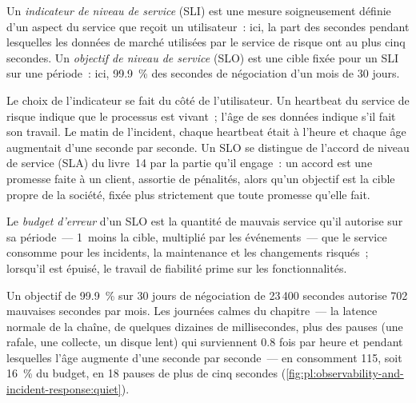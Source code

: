 \begin{definition}\label{def:pl:observability-and-incident-response:sli}
Un \emph{indicateur de niveau de service} (SLI) est une mesure soigneusement définie d'un aspect du service que reçoit un
utilisateur~: ici, la part des secondes pendant lesquelles les données de marché utilisées par le service de risque ont au plus cinq secondes. Un \emph{objectif de
niveau de service} (SLO) est une cible fixée pour un SLI sur une période~: ici, 99.9~\% des secondes de négociation d'un mois de 30 jours.
\end{definition}

Le choix de l'indicateur se fait du côté de l'utilisateur. Un heartbeat du service de risque indique que le processus est vivant~; l'âge de ses données indique
s'il fait son travail. Le matin de l'incident, chaque heartbeat était à l'heure et chaque âge augmentait d'une seconde par seconde. Un SLO se distingue
de l'accord de niveau de service (SLA) du livre~14 par la partie qu'il engage~: un accord est une promesse faite à un client, assortie de pénalités, alors qu'un objectif est la cible propre de la société,
fixée plus strictement que toute promesse qu'elle fait.

\begin{definition}\label{def:pl:observability-and-incident-response:budget}
Le \emph{budget d'erreur} d'un SLO est la quantité de mauvais service qu'il autorise sur sa période~--- 1~moins la cible, multiplié par les
événements~--- que le service consomme pour les incidents, la maintenance et les changements risqués~; lorsqu'il est épuisé, le travail de fiabilité prime sur
les fonctionnalités.
\end{definition}

Un objectif de 99.9~\% sur 30 jours de négociation de 23\,400 secondes autorise 702 mauvaises secondes par mois. Les journées calmes du chapitre~--- la latence normale
de la chaîne, de quelques dizaines de millisecondes, plus des pauses (une rafale, une collecte, un disque lent) qui surviennent 0.8 fois par heure et pendant lesquelles l'âge augmente
d'une seconde par seconde~--- en consomment 115, soit 16~\% du budget, en 18 pauses de plus de cinq secondes
(\cref{fig:pl:observability-and-incident-response:quiet}).

